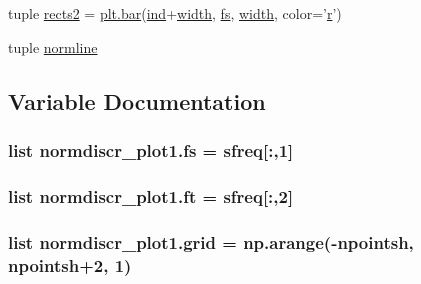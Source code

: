 \begin{DoxyCompactItemize}
\item 
tuple \hyperlink{namespacenormdiscr__plot1_a00a3be784e50ee3b07b6a8a9fbf8ba27}{rects2} = \hyperlink{eepromer_8c_a2924c0b64ca8f0b241891bcc826b5602}{plt.\+bar}(\hyperlink{namespacenormdiscr__plot1_a67682d8f96953cd3e89c85879fda2720}{ind}+\hyperlink{namespacenormdiscr__plot1_a6c937267be6822f1ede0b9b040779f27}{width}, \hyperlink{namespacenormdiscr__plot1_a0446c5eb37b12bdea2ce5f1705261e33}{fs}, \hyperlink{namespacenormdiscr__plot1_a6c937267be6822f1ede0b9b040779f27}{width}, color='\hyperlink{indexexpr_8h_ac434fd11cc2493608d8d91424d60c17e}{r}')
\item 
tuple \hyperlink{namespacenormdiscr__plot1_a05db0418bf9e3cb9363768346fd33093}{normline}
\end{DoxyCompactItemize}


\subsection{Variable Documentation}
\hypertarget{namespacenormdiscr__plot1_a0446c5eb37b12bdea2ce5f1705261e33}{}
\subsubsection[{fs}]{\setlength{\rightskip}{0pt plus 5cm}list normdiscr\+\_\+plot1.\+fs = {\bf sfreq}\mbox{[}\+:,1\mbox{]}}\label{namespacenormdiscr__plot1_a0446c5eb37b12bdea2ce5f1705261e33}
\hypertarget{namespacenormdiscr__plot1_a400e325c29f040931fb0858597b37053}{}
\subsubsection[{ft}]{\setlength{\rightskip}{0pt plus 5cm}list normdiscr\+\_\+plot1.\+ft = {\bf sfreq}\mbox{[}\+:,2\mbox{]}}\label{namespacenormdiscr__plot1_a400e325c29f040931fb0858597b37053}
\hypertarget{namespacenormdiscr__plot1_af8eb490ddab12afc11e8a4e7144d7843}{}
\subsubsection[{grid}]{\setlength{\rightskip}{0pt plus 5cm}list normdiscr\+\_\+plot1.\+grid = np.\+arange(-\/{\bf npointsh}, {\bf npointsh}+2, 1)}\label{namespacenormdiscr__plot1_af8eb490ddab12afc11e8a4e7144d7843}
\hypertarget{namespacenormdiscr__plot1_a3b3d0e3f33ebb403b17ac30f9642feae}{}
